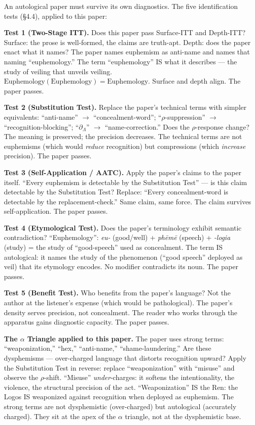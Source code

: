 \documentclass[11pt, oneside]{article}
\theoremstyle{definition}
\begin{document}
An autological paper must survive its own diagnostics. The five identification tests (\S4.4), applied to this paper:

\textbf{Test 1 (Two-Stage ITT).} Does this paper pass Surface-ITT and Depth-ITT? Surface: the prose is well-formed, the claims are truth-apt. Depth: does the paper enact what it names? The paper names euphemism as anti-name and names that naming ``euphemology.'' The term ``euphemology'' IS what it describes --- the study of veiling that unveils veiling. $\text{Euphemology}(\text{Euphemology}) = \text{Euphemology}$. Surface and depth align. The paper passes.

\textbf{Test 2 (Substitution Test).} Replace the paper's technical terms with simpler equivalents: ``anti-name'' $\to$ ``concealment-word''; ``$\rho$-suppression'' $\to$ ``recognition-blocking''; ``$\partial_\Lambda$'' $\to$ ``name-correction.'' Does the $\rho$-response change? The meaning is preserved; the precision decreases. The technical terms are not euphemisms (which would \textit{reduce} recognition) but compressions (which \textit{increase} precision). The paper passes.

\textbf{Test 3 (Self-Application / AATC).} Apply the paper's claims to the paper itself. ``Every euphemism is detectable by the Substitution Test'' --- is this claim detectable by the Substitution Test? Replace: ``Every concealment-word is detectable by the replacement-check.'' Same claim, same force. The claim survives self-application. The paper passes.

\textbf{Test 4 (Etymological Test).} Does the paper's terminology exhibit semantic contradiction? ``Euphemology'': \textit{eu-} (good/well) + \textit{ph\={e}m\={e}} (speech) + \textit{-logia} (study) = the study of ``good-speech'' used as concealment. The term IS autological: it names the study of the phenomenon (``good speech'' deployed as veil) that its etymology encodes. No modifier contradicts its noun. The paper passes.

\textbf{Test 5 (Benefit Test).} Who benefits from the paper's language? Not the author at the listener's expense (which would be pathological). The paper's density serves precision, not concealment. The reader who works through the apparatus gains diagnostic capacity. The paper passes.

\textbf{The $\alpha$ Triangle applied to this paper.} The paper uses strong terms: ``weaponization,'' ``hex,'' ``anti-name,'' ``shame-laundering.'' Are these dysphemisms --- over-charged language that distorts recognition upward? Apply the Substitution Test in reverse: replace ``weaponization'' with ``misuse'' and observe the $\rho$-shift. ``Misuse'' \textit{under}-charges: it softens the intentionality, the violence, the structural precision of the act. ``Weaponization'' IS the Ren: the Logos IS weaponized against recognition when deployed as euphemism. The strong terms are not dysphemistic (over-charged) but autological (accurately charged). They sit at the apex of the $\alpha$ triangle, not at the dysphemistic base.
\end{document}
